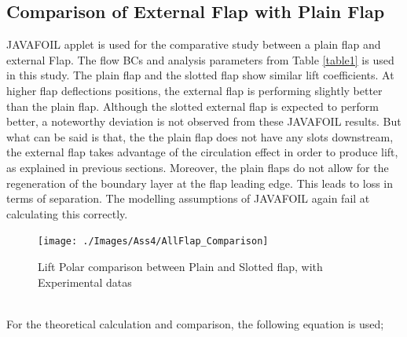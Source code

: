 \documentclass[main.tex]{subfiles}
\begin{document}
\subsection{Comparison of External Flap with Plain Flap}
JAVAFOIL applet is used for the comparative study between a plain flap and external Flap. The flow BCs and analysis parameters from Table \ref{table1} is used in this study. The plain flap and the slotted flap show similar lift coefficients. At higher flap deflections positions, the external flap is performing slightly better than the plain flap. Although the slotted external flap is expected to perform better, a noteworthy deviation is not observed from these JAVAFOIL results. But what can be said is that, the the plain flap does not have any slots downstream, the external flap takes advantage of the circulation effect in order to produce lift, as explained in previous sections. Moreover, the plain flaps do not allow for the regeneration of the boundary layer at the flap leading edge. This leads to loss in terms of separation. The modelling assumptions of JAVAFOIL again fail at calculating this correctly.
\pagebreak
\begin{figure}[h!]
\centering
\texttt{[image: ./Images/Ass4/AllFlap\_Comparison]}
\caption{Lift Polar comparison between Plain and Slotted flap, with Experimental datas}
\label{fig7}
\end{figure}

\\\noindent For the theoretical calculation and comparison, the following equation is used\cite{irving1976synthesis};
\end{document}
